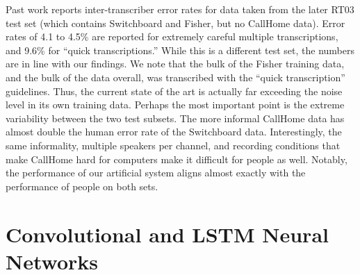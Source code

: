 \documentclass{article}
\begin{document}
Past work \cite{glenn2010transcription} reports inter-transcriber error
rates for data taken from the later
RT03 test set (which contains Switchboard and Fisher, but no CallHome data).
Error rates of 4.1 to 4.5\% are reported for extremely careful multiple
transcriptions, and 9.6\% for ``quick transcriptions.''
While this is a different test set, the numbers are in line with 
our findings. 
We note that the bulk of the Fisher training data, and 
the bulk of the data overall, was transcribed with the ``quick transcription''
guidelines. Thus, the current state of the art is actually far exceeding the 
noise level in its own training data.
Perhaps the most important point is the extreme  variability between the two test subsets.
The more informal CallHome data has almost double the human error 
rate of the Switchboard data. Interestingly, the same informality, multiple speakers per channel,
and recording conditions that make CallHome hard for computers
make it difficult for people as well.  Notably, the performance of 
our artificial system aligns almost exactly with the performance of people
on both sets.
\section{Convolutional and LSTM Neural Networks}
\label{sec:cnn+lstm}
\end{document}
